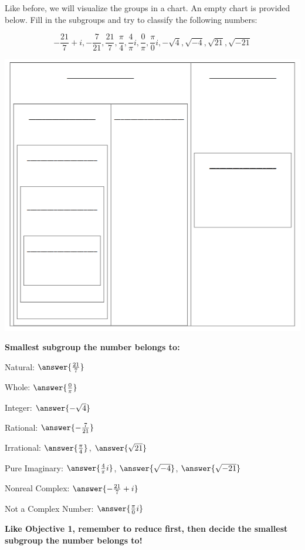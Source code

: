 \documentclass{ximera}
\begin{document}
\begin{question}
Like before, we will visualize the groups in a chart. An empty chart is provided below. Fill in the subgroups and try to classify the following numbers: 

$$ -\frac{21}{7}+i, -\frac{7}{21}, \frac{21}{7}, \frac{\pi}{4}, \frac{4}{\pi}i, \frac{0}{\pi}, \frac{\pi}{0}i, -\sqrt{4}, \sqrt{-4}, \sqrt{21}, \sqrt{-21} $$

\includegraphics{complexNumbersChart.png}

\textbf{Smallest subgroup the number belongs to:} 

Natural: $\answer{\frac{21}{7}}$

Whole: $\answer{\frac{0}{\pi}}$

Integer: $\answer{-\sqrt{4}}$

Rational: $\answer{-\frac{7}{21}}$

Irrational: $\answer{\frac{\pi}{4}}$, $\answer{\sqrt{21}}$

Pure Imaginary: $\answer{\frac{4}{\pi}i}$, $\answer{\sqrt{-4}}$, $\answer{\sqrt{-21}}$

Nonreal Complex: $\answer{-\frac{21}{7} + i}$

Not a Complex Number: $\answer{\frac{\pi}{0}i}$

\end{question}

\textbf{Like Objective 1, remember to reduce first, then decide the smallest subgroup the number belongs to!}
\end{document}

